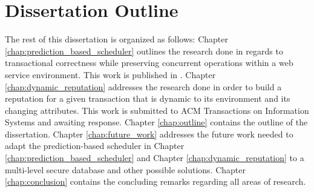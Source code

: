 \section{Dissertation Outline}
The rest of this dissertation is organized as follows: Chapter \ref{chap:prediction_based_scheduler} outlines the research done in regards to transactional correctness while preserving concurrent operations within a web service environment. This work is published in \cite{ravan_ensuring_2020}. Chapter \ref{chap:dynamic_reputation} addresses the research done in order to build a reputation for a given transaction that is dynamic to its environment and its changing attributes. This work is submitted to ACM Transactions on Information Systems and awaiting response. Chapter \ref{chap:outline} contains the outline of the dissertation. Chapter \ref{chap:future_work} addresses the future work needed to adapt the prediction-based scheduler in Chapter \ref{chap:prediction_based_scheduler} and Chapter \ref{chap:dynamic_reputation} to a multi-level secure database and other possible solutions. Chapter \ref{chap:conclusion} contains the concluding remarks regarding all areas of research.